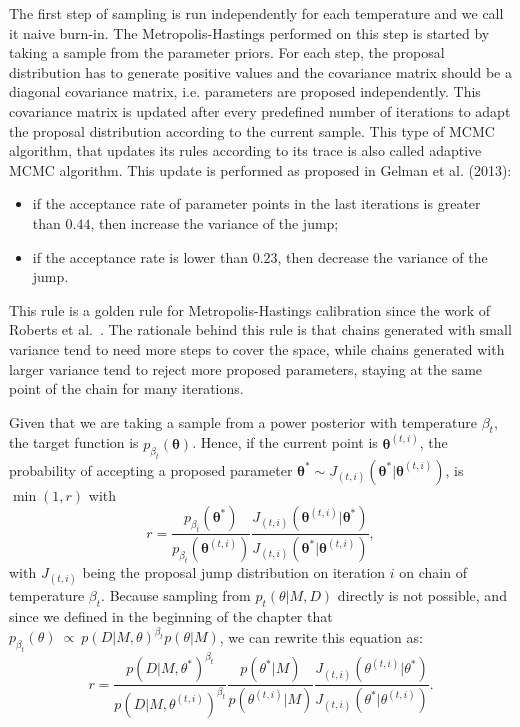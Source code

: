 %

The first step of sampling is run independently for each temperature and
we call it naive burn-in. The Metropolis-Hastings performed on this step
is started by taking a sample from the parameter priors. For each step,
the proposal distribution has to generate positive values and the
covariance matrix should be a diagonal covariance matrix, i.e. 
parameters are proposed independently. This covariance matrix is updated 
after every predefined number of iterations to adapt the proposal 
distribution according to the current sample. This type of MCMC 
algorithm, that updates its rules according to its trace is also called
adaptive MCMC algorithm. This update is performed as proposed in Gelman 
et al. (2013): 
\begin{itemize}
\item{if the acceptance rate of parameter points in the last 
    iterations is greater than $0.44$, then increase the variance of the
    jump;}
\item{if the acceptance rate is lower than $0.23$, then decrease the 
    variance of the jump.}
\end{itemize}
This rule is a golden rule for Metropolis-Hastings calibration since the
work of Roberts et al.~\cite{Roberts1997}. The rationale behind this
rule is that chains generated with small variance tend to need more 
steps to cover the space, while chains generated with larger variance
tend to reject more proposed parameters, staying at the same point of
the chain for many iterations.

Given that we are taking a sample from a power posterior with 
temperature $\beta_t$, the target function is  $p_{\beta_t} ({\bm
\theta})$. Hence, if the current point is ${\bm \theta}^{(t, i)}$, the 
probability of accepting a proposed parameter 
${\bm \theta}^* \sim J_{(t, i)} ({\bm \theta}^* | {\bm \theta}^{(t,
i)})$, is $\min (1, r)$ with
\begin{equation*}
    r = \frac{p_{\beta_t} ({\bm \theta}^*)}
             {p_{\beta_t} ({\bm \theta}^{(t, i)})}
        \frac{J_{(t, i)} ({\bm \theta}^{(t, i)} | {\bm \theta}^*)}
             {J_{(t, i)} ({\bm \theta}^* | {\bm \theta}^{(t, i)})},
\end{equation*}
with $J_{(t, i)}$ being the proposal jump distribution on iteration $i$ 
on chain of temperature $\beta_t$. Because sampling from $p_t(\theta | 
M, D)$ directly is not possible, and  since we defined in the beginning 
of the chapter that 
$p_{\beta_t} (\theta)~\propto~p (D|M, \theta)^{\beta_t} p (\theta | M)$,
we can rewrite this equation as:
\begin{equation}
    r = \frac{p (D | M, \theta^*)^{\beta_t}}
             {p (D | M, \theta^{(t, i)})^{\beta_t}}
        \frac{p (\theta^* | M)}
             {p (\theta^{(t, i)} | M)}
        \frac{J_{(t, i)} (\theta^{(t, i)} | \theta^*)}
             {J_{(t, i)} (\theta^* | \theta^{(t, i)})}.
    \label{eq:mh_ratio_step1}
\end{equation}

